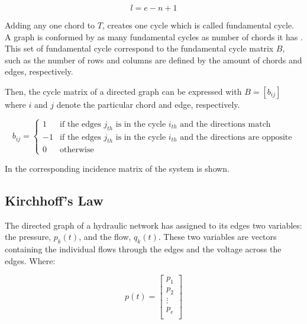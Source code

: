 \begin{equation}
  \label{Numberofchords}
  l = e - n +1
\end{equation}

Adding any one chord to $T$, creates one cycle which is called fundamental cycle. A graph is conformed by as many fundamental cycles as number of chords it has \cite{GraphModel}.  
This set of fundamental cycle correspond to the fundamental cycle matrix 
$B$, such as the number of rows and columns are defined by the amount of chords and edges, respectively. 

Then, the cycle matrix of a directed graph can be 
expressed with $B = [b_{ij}]$ where $i$ and $j$ denote the particular chord and 
edge, respectively. 

\begin{equation}
\label{DiGraphCycle}
 b_{ij} =
		\left\{
		\begin{array}{ll}
		
		1 			&      \text{if the edges $j_{th}$ is in the cycle $i_{th}$ and the directions match}	
\\
		-1                       &     \text{if the edges $j_{th}$ is in the cycle $i_{th}$ and the directions are opposite}
\\

                0                       &      \text{otherwise}

		\end{array}
		\right.
\end{equation}	

In  the corresponding incidence matrix of the system is 
shown.

\subsection{Kirchhoff's Law}
\label{KirchhoffSection}

The directed graph of a hydraulic network has assigned to its edges two variables: 
the pressure, $p_k(t)$, and the flow, $q_k(t)$. These two variables are vectors containing the individual flows through the edges and 
the voltage across the edges. Where:


\begin{minipage}{0.45\linewidth}
\begin{equation}
p(t) =
\begin{bmatrix}
         p_1 \\
	p_2 \\ 
	\vdots \\
	p_e \\
\end{bmatrix}  \nonumber
\end{equation}  
\end{minipage}

